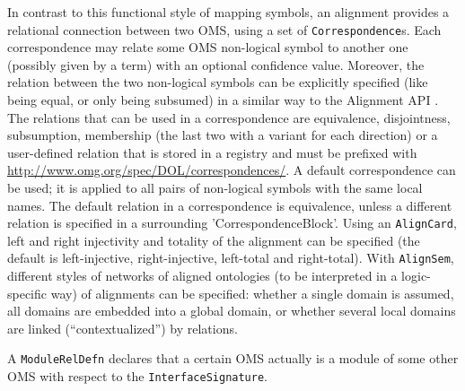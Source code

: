 \documentclass[10pt,fleqn,%
\ifpretendfinal
final%
\else
draft%
\fi,
]{scrreprt}
\newcommand{\red}[1]{#1} %
\newcommand*{\termref}[1]{\index{#1}#1\xspace}
\newcommand*{\syntax}[1]{\texttt{#1}}
\begin{document}
In contrast to this functional style of mapping symbols, an alignment provides a relational 
connection between two OMS,  using a set of \syntax{Correspondence}s. Each correspondence may relate 
some OMS non-logical symbol to another one (possibly given by a term) with an optional confidence 
value. Moreover, the relation between the two non-logical symbols can be explicitly
specified (like being equal, or only being subsumed) in a similar way to the Alignment API \cite{AlignmentAPI}. 
\red{The relations that can be used in a correspondence are equivalence, disjointness, subsumption, membership (the last two with a
variant for each direction) or a user-defined relation that is stored in a registry and must be prefixed with
\url{http://www.omg.org/spec/DOL/correspondences/}.
A default correspondence can be used; it is applied to all pairs of non-logical symbols with 
the same local names. The default relation in a correspondence is equivalence, unless  a different 
relation is specified in a surrounding 
'CorrespondenceBlock'.
Using an \syntax{AlignCard}, left and right injectivity and totality of the
\termref{alignment} can be specified (the default is left-injective, right-injective, left-total  and right-total).
With \syntax{AlignSem}, different styles of networks of aligned ontologies (to be interpreted in 
a logic-specific way) of alignments can be specified: whether a single domain is assumed, all domains are embedded into a global domain,
or whether several local domains are linked (``contextualized'') by relations.}

A \syntax{ModuleRelDefn} declares that a certain OMS
actually is a module of some other OMS with respect
to the \syntax{InterfaceSignature}.
\end{document}
